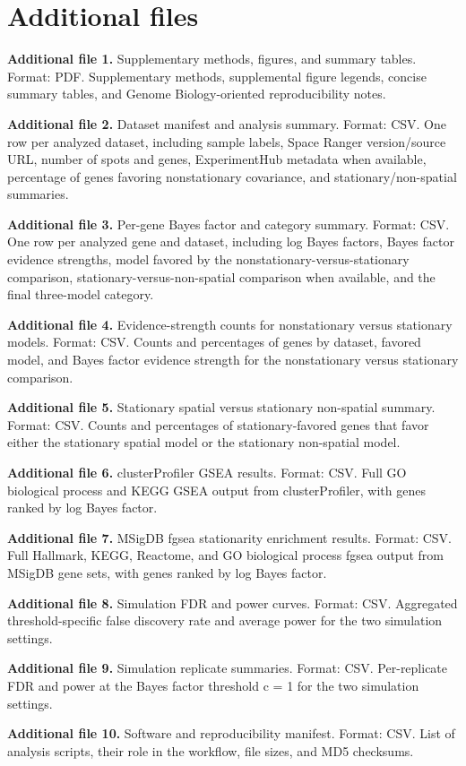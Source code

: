 \section*{Additional files}
\textbf{Additional file 1.} Supplementary methods, figures, and summary tables. Format: PDF. Supplementary methods, supplemental figure legends, concise summary tables, and Genome Biology-oriented reproducibility notes.

\textbf{Additional file 2.} Dataset manifest and analysis summary. Format: CSV. One row per analyzed dataset, including sample labels, Space Ranger version/source URL, number of spots and genes, ExperimentHub metadata when available, percentage of genes favoring nonstationary covariance, and stationary/non-spatial summaries.

\textbf{Additional file 3.} Per-gene Bayes factor and category summary. Format: CSV. One row per analyzed gene and dataset, including log Bayes factors, Bayes factor evidence strengths, model favored by the nonstationary-versus-stationary comparison, stationary-versus-non-spatial comparison when available, and the final three-model category.

\textbf{Additional file 4.} Evidence-strength counts for nonstationary versus stationary models. Format: CSV. Counts and percentages of genes by dataset, favored model, and Bayes factor evidence strength for the nonstationary versus stationary comparison.

\textbf{Additional file 5.} Stationary spatial versus stationary non-spatial summary. Format: CSV. Counts and percentages of stationary-favored genes that favor either the stationary spatial model or the stationary non-spatial model.

\textbf{Additional file 6.} clusterProfiler GSEA results. Format: CSV. Full GO biological process and KEGG GSEA output from clusterProfiler, with genes ranked by log Bayes factor.

\textbf{Additional file 7.} MSigDB fgsea stationarity enrichment results. Format: CSV. Full Hallmark, KEGG, Reactome, and GO biological process fgsea output from MSigDB gene sets, with genes ranked by log Bayes factor.

\textbf{Additional file 8.} Simulation FDR and power curves. Format: CSV. Aggregated threshold-specific false discovery rate and average power for the two simulation settings.

\textbf{Additional file 9.} Simulation replicate summaries. Format: CSV. Per-replicate FDR and power at the Bayes factor threshold c = 1 for the two simulation settings.

\textbf{Additional file 10.} Software and reproducibility manifest. Format: CSV. List of analysis scripts, their role in the workflow, file sizes, and MD5 checksums.
